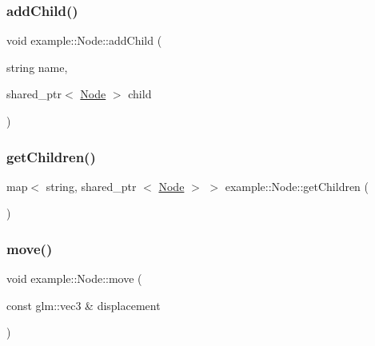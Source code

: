 \subsubsection{\texorpdfstring{add\+Child()}{addChild()}}
{\footnotesize\ttfamily void example\+::\+Node\+::add\+Child (\begin{DoxyParamCaption}\item[{string}]{name,  }\item[{shared\+\_\+ptr$<$ \mbox{\hyperlink{classexample_1_1_node}{Node}} $>$}]{child }\end{DoxyParamCaption})\hspace{0.3cm}{\ttfamily [inline]}}

\mbox{\label{classexample_1_1_node_a35e8fbeddcdf711d734bd00a470f0178}} 
\subsubsection{\texorpdfstring{get\+Children()}{getChildren()}}
{\footnotesize\ttfamily map$<$ string, shared\+\_\+ptr $<$ \mbox{\hyperlink{classexample_1_1_node}{Node}} $>$ $>$ example\+::\+Node\+::get\+Children (\begin{DoxyParamCaption}{ }\end{DoxyParamCaption})\hspace{0.3cm}{\ttfamily [inline]}}

\mbox{\label{classexample_1_1_node_af0193704909c9018ba9ceab210556bb7}} 
\subsubsection{\texorpdfstring{move()}{move()}}
{\footnotesize\ttfamily void example\+::\+Node\+::move (\begin{DoxyParamCaption}\item[{const glm\+::vec3 \&}]{displacement }\end{DoxyParamCaption})\hspace{0.3cm}{\ttfamily [inline]}}

\mbox{\label{classexample_1_1_node_a520d3d88a4600b0d9987dbeae10ddede}} 
